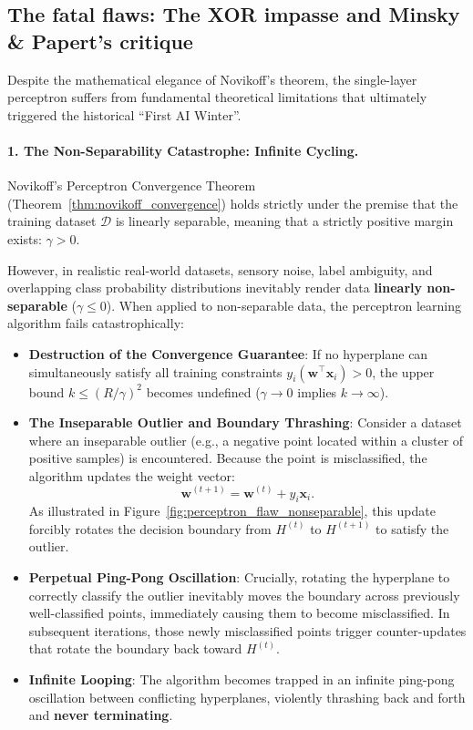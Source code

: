 \subsection{The fatal flaws: The XOR impasse and Minsky \& Papert's critique}
\label{sec:xor_and_minsky_critique}

Despite the mathematical elegance of Novikoff's theorem, the single-layer perceptron suffers from fundamental theoretical limitations that ultimately triggered the historical ``First AI Winter''.

\paragraph{1. The Non-Separability Catastrophe: Infinite Cycling.}
Novikoff's Perceptron Convergence Theorem (Theorem~\ref{thm:novikoff_convergence}) holds strictly under the premise that the training dataset $\mathcal{D}$ is linearly separable, meaning that a strictly positive margin exists: $\gamma > 0$. 

However, in realistic real-world datasets, sensory noise, label ambiguity, and overlapping class probability distributions inevitably render data \textbf{linearly non-separable} ($\gamma \le 0$). When applied to non-separable data, the perceptron learning algorithm fails catastrophically:
\begin{itemize}[leftmargin=*]
  \item \textbf{Destruction of the Convergence Guarantee}: If no hyperplane can simultaneously satisfy all training constraints $y_i(\mathbf{w}^\top \mathbf{x}_i) > 0$, the upper bound $k \le (R/\gamma)^2$ becomes undefined ($\gamma \to 0$ implies $k \to \infty$).
  \item \textbf{The Inseparable Outlier and Boundary Thrashing}: Consider a dataset where an inseparable outlier (e.g., a negative point located within a cluster of positive samples) is encountered. Because the point is misclassified, the algorithm updates the weight vector:
  \begin{equation}
  \mathbf{w}^{(t+1)} = \mathbf{w}^{(t)} + y_i \mathbf{x}_i.
  \end{equation}
  As illustrated in Figure~\ref{fig:perceptron_flaw_nonseparable}, this update forcibly rotates the decision boundary from $H^{(t)}$ to $H^{(t+1)}$ to satisfy the outlier.
  \item \textbf{Perpetual Ping-Pong Oscillation}: Crucially, rotating the hyperplane to correctly classify the outlier inevitably moves the boundary across previously well-classified points, immediately causing them to become misclassified. In subsequent iterations, those newly misclassified points trigger counter-updates that rotate the boundary back toward $H^{(t)}$.
  \item \textbf{Infinite Looping}: The algorithm becomes trapped in an infinite ping-pong oscillation between conflicting hyperplanes, violently thrashing back and forth and \textbf{never terminating}.
\end{itemize}

